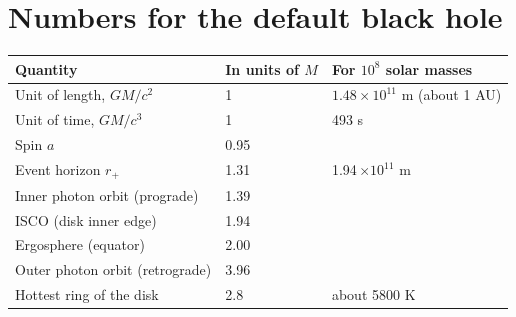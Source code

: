 \documentclass[11pt,a4paper]{article}
\begin{document}
\section{Numbers for the default black hole}

\begin{center}
\begin{tabular}{lll}
  \hline
  Quantity & In units of $M$ & For $10^8$ solar masses \\
  \hline
  Unit of length, $GM/c^2$ & 1 & $1.48\times10^{11}$ m (about 1 AU) \\
  Unit of time, $GM/c^3$ & 1 & 493 s \\
  Spin $a$ & 0.95 & \\
  Event horizon $r_+$ & 1.31 & 1.94\,$\times10^{11}$ m \\
  Inner photon orbit (prograde) & 1.39 & \\
  ISCO (disk inner edge) & 1.94 & \\
  Ergosphere (equator) & 2.00 & \\
  Outer photon orbit (retrograde) & 3.96 & \\
  Hottest ring of the disk & 2.8 & about 5800 K \\
  \hline
\end{tabular}
\end{center}
\end{document}
